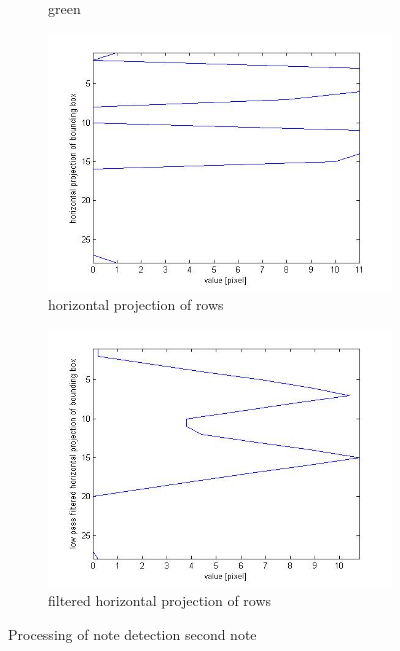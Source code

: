 \begin{figure}[htbp]
\begin{subfigure}[c]{0.1\textwidth}
        \caption{green}
  \end{subfigure}
  \begin{subfigure}[c]{0.4\textwidth}
        \includegraphics[width=\textwidth]{2e.jpg}
        \caption{horizontal projection of rows}
  \end{subfigure}
  \begin{subfigure}[c]{0.4\textwidth}
        \includegraphics[width=\textwidth]{2f.jpg}
        \caption{filtered horizontal projection of rows}
  \end{subfigure}
	\caption{Processing of note detection second note}
	\label{fig:noteValues2}
\end{figure}

